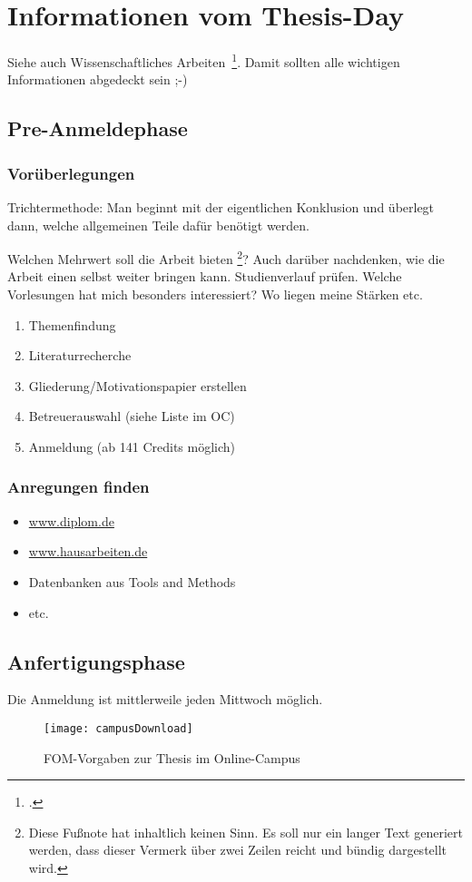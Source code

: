 \newpage
\section{Informationen vom Thesis-Day} \label{infos}
Siehe auch Wissenschaftliches Arbeiten~\footcite[Vgl. ][S. 1]{Balzert.2008}. Damit sollten alle wichtigen Informationen abgedeckt sein ;-)

\subsection{Pre-Anmeldephase}
\subsubsection{Vorüberlegungen}
Trichtermethode: Man beginnt mit der eigentlichen  Konklusion und überlegt dann, welche allgemeinen Teile dafür benötigt werden.

Welchen Mehrwert soll die Arbeit bieten \footnote{Diese Fu\ss note hat inhaltlich keinen Sinn. Es soll nur ein langer Text generiert werden, dass dieser Vermerk über zwei Zeilen reicht und bündig dargestellt wird.}? Auch darüber nachdenken, wie die Arbeit einen selbst weiter bringen kann. Studienverlauf prüfen. Welche Vorlesungen hat mich besonders interessiert? Wo liegen meine Stärken etc.

\begin{enumerate}
\item Themenfindung
\item Literaturrecherche
\item Gliederung/Motivationspapier erstellen
\item Betreuerauswahl (siehe Liste im \ac{OC})
\item Anmeldung (ab 141 Credits möglich)
\end{enumerate}

\subsubsection{Anregungen finden}
\begin{itemize}
\item \href{http://www.diplom.de}{www.diplom.de}
\item \href{http://www.hausarbeiten.de}{www.hausarbeiten.de}
\item Datenbanken aus Tools and Methods
\item etc.
\end{itemize}

\newpage
\subsection{Anfertigungsphase}
Die Anmeldung ist mittlerweile jeden Mittwoch möglich.
\begin{figure}[H]
\caption{FOM-Vorgaben zur Thesis im Online-Campus}
\texttt{[image: campusDownload]}
\\
\cite[Quelle: Vgl.][]{FOM}
\end{figure}

